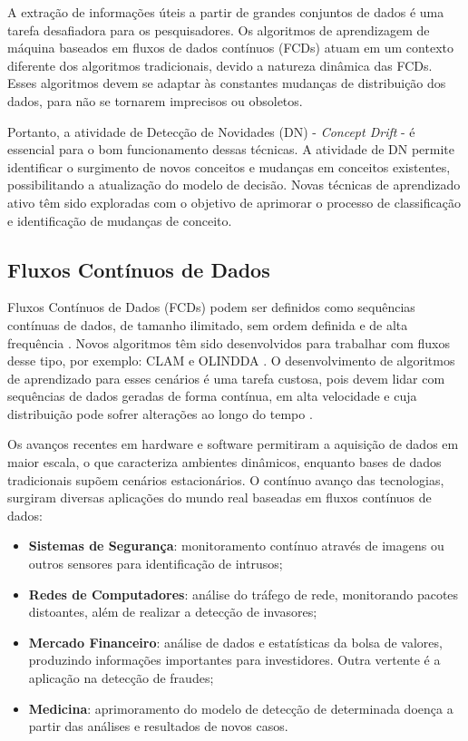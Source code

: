 \documentclass[qual, classic, a4paper]{ufbathesis}
\begin{document}
A extração de informações úteis a partir de grandes conjuntos de dados é uma tarefa desafiadora para os pesquisadores.
Os algoritmos de aprendizagem de máquina baseados em fluxos de dados contínuos (FCDs) atuam em um contexto diferente dos algoritmos tradicionais, 
devido a natureza dinâmica das FCDs.
Esses algoritmos devem se adaptar às constantes mudanças de distribuição dos dados, para não se tornarem imprecisos ou obsoletos.

Portanto, a atividade de Detecção de Novidades (DN) - \textit{Concept Drift} - é essencial para o bom funcionamento dessas técnicas. A atividade de DN permite identificar o surgimento de novos conceitos e mudanças em conceitos existentes, possibilitando a atualização do modelo de decisão. Novas técnicas de aprendizado ativo têm sido exploradas com o objetivo de aprimorar o processo de classificação e identificação de mudanças de conceito. 

\subsection{Fluxos Contínuos de Dados}

Fluxos Contínuos de Dados (FCDs) podem ser definidos como sequências contínuas de dados, de tamanho ilimitado, sem ordem definida e de alta frequência \cite{Babcock:2002:MID:543613.543615}. Novos algoritmos têm sido desenvolvidos para trabalhar com fluxos desse tipo, por exemplo: CLAM \cite{malkhateeb} e OLINDDA \cite{Spinosa:2009:NDA:1551768.1551770}. O desenvolvimento de algoritmos de aprendizado para esses cenários é uma tarefa custosa, pois devem lidar com sequências de dados geradas de forma contínua, em alta velocidade e cuja distribuição pode sofrer alterações ao longo do tempo \cite{Gama:2014:survey}.

Os avanços recentes em hardware e software permitiram a aquisição de dados em maior escala, o que caracteriza ambientes dinâmicos, enquanto bases de dados tradicionais supõem cenários estacionários. O contínuo avanço das tecnologias, surgiram diversas aplicações do mundo real baseadas em fluxos contínuos de dados: 

\begin{itemize}
    \item \textbf{Sistemas de Segurança}: monitoramento contínuo através de imagens ou outros sensores para identificação de intrusos;

    \item \textbf{Redes de Computadores}: análise do tráfego de rede, monitorando pacotes distoantes, além de realizar a detecção de invasores;

    \item \textbf{Mercado Financeiro}: análise de dados e estatísticas da bolsa de valores, produzindo informações importantes para investidores. Outra vertente é a aplicação na detecção de fraudes;

    \item \textbf{Medicina}: aprimoramento do modelo de detecção de determinada doença a partir das análises e resultados de novos casos.
\end{itemize}
\end{document}
